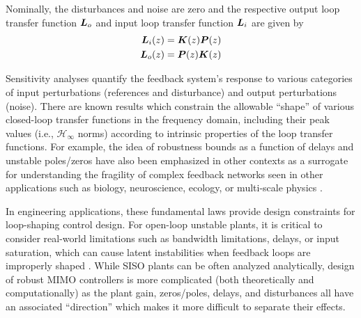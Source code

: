 Nominally, the disturbances and noise are zero and the respective output loop transfer function $\vb*{L}_{o}$ and input loop transfer function $\vb*{L}_{i}$ are given by
\begin{subequations}
\label{eq:input_output_sensitivities}
\begin{align}
	\vb*{L}_{i}(z) = \vb*{K}(z)\vb*{P}(z) \label{eq:input_loop_transfer}\\
	\vb*{L}_{o}(z) = \vb*{P}(z)\vb*{K}(z) \label{eq:output_loop_transfer} 
\end{align}
\end{subequations}

Sensitivity analyses quantify the feedback system's response to various categories of input perturbations (references and disturbance) and output perturbations (noise).  There are known results which constrain the allowable ``shape'' of various closed-loop transfer functions in the frequency domain, including their peak values (i.e., $\mathcal{H}_{\infty}$ norms) according to intrinsic properties of the loop transfer functions.  For example, the idea of robustness bounds as a function of delays and unstable poles/zeros have also been emphasized in other contexts as a surrogate for understanding the fragility of complex feedback networks seen in other applications such as biology, neuroscience, ecology, or multi-scale physics \cite{doyle2011universal, leong2016understanding, doyle2017universal}.

In engineering applications, these fundamental laws provide design constraints for loop-shaping control design.  For open-loop unstable plants, it is critical to consider real-world limitations such as bandwidth limitations, delays, or input saturation, which can cause latent instabilities when feedback loops are improperly shaped \cite{stein2003respect}.  While SISO plants can be often analyzed analytically, design of robust MIMO controllers is more complicated (both theoretically and computationally) as the plant gain, zeros/poles, delays, and disturbances all have an associated ``direction'' which makes it more difficult to separate their effects.

